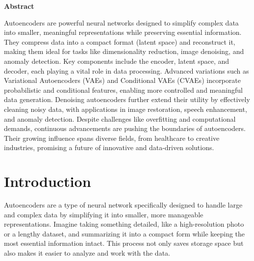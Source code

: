 \documentclass[a4paper,12pt]{article}
\begin{document}
    \begin{center}
        \begin{large}
            \textbf{Abstract} \\[0.5cm]
        \end{large}
        
        \begin{minipage}{0.76\textwidth} %
            \justify
            Autoencoders are powerful neural networks designed to simplify complex data into smaller, meaningful representations while preserving essential information. They compress data into a compact format (latent space) and reconstruct it, making them ideal for tasks like dimensionality reduction, image denoising, and anomaly detection. Key components include the encoder, latent space, and decoder, each playing a vital role in data processing.
Advanced variations such as Variational Autoencoders (VAEs) and Conditional VAEs (CVAEs) incorporate probabilistic and conditional features, enabling more controlled and meaningful data generation. Denoising autoencoders further extend their utility by effectively cleaning noisy data, with applications in image restoration, speech enhancement, and anomaly detection.
Despite challenges like overfitting and computational demands, continuous advancements are pushing the boundaries of autoencoders. Their growing influence spans diverse fields, from healthcare to creative industries, promising a future of innovative and data-driven solutions.
        \end{minipage}
    \end{center}

\vspace{0.5cm}


\section{Introduction}  
Autoencoders are a type of neural network specifically designed to handle large and complex data by simplifying it into smaller, more manageable representations. Imagine taking something detailed, like a high-resolution photo or a lengthy dataset, and summarizing it into a compact form while keeping the most essential information intact. This process not only saves storage space but also makes it easier to analyze and work with the data.  
\end{document}

